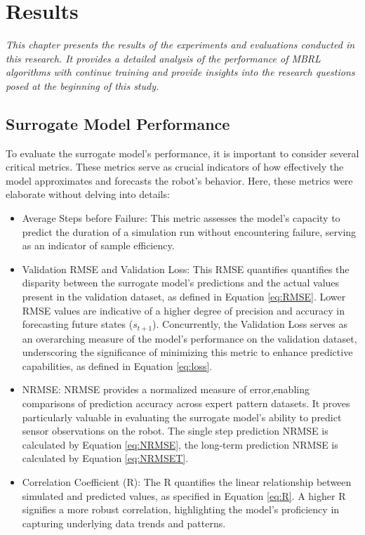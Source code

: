 \chapter{Results}
\label{chap5}
\textit{This chapter presents the results of the experiments and evaluations conducted in this research. It provides a detailed analysis of the performance of MBRL algorithms with continue training and provide insights into the research questions posed at the beginning of this study.}

\section{Surrogate Model Performance}
To evaluate the surrogate model's performance, it is important to consider several critical metrics. These metrics serve as crucial indicators of how effectively the model approximates and forecasts the robot's behavior. Here, these metrics were elaborate without delving into details:
\begin{itemize}
    \item Average Steps before Failure: This metric assesses the model's capacity to predict the duration of a simulation run without encountering failure, serving as an indicator of sample efficiency.
    \item Validation RMSE and Validation Loss: This RMSE quantifies quantifies the disparity between the surrogate model's predictions and the actual values present in the validation dataset, as defined in Equation \ref{eq:RMSE}. Lower RMSE values are indicative of a higher degree of precision and accuracy in forecasting future states ($s_{t+1}$). Concurrently, the Validation Loss serves as an overarching measure of the model's performance on the validation dataset, underscoring the significance of minimizing this metric to enhance predictive capabilities, as defined in Equation \ref{eq:loss}.
    \item NRMSE: NRMSE provides a normalized measure of error,enabling comparisons of prediction accuracy across expert pattern datasets. It proves particularly valuable in evaluating the surrogate model's ability to predict sensor observations on the robot. The single step prediction NRMSE is calculated by Equation \ref{eq:NRMSE}, the long-term prediction NRMSE is calculated by Equation \ref{eq:NRMSET}.
    \item Correlation Coefficient (R): The R quantifies the linear relationship between simulated and predicted values, as specified in Equation \ref{eq:R}. A higher R signifies a more robust correlation, highlighting the model's proficiency in capturing underlying data trends and patterns.
\end{itemize}


